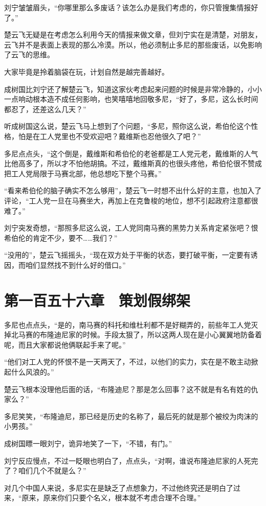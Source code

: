 刘宁皱皱眉头，“你哪里那么多废话？该怎么办是我们考虑的，你只管搜集情报好了。”

楚云飞无疑是在考虑怎么利用今天的情报来做文章，但刘宁实在是清楚，对朋友，云飞并不是表面上表现的那么冷漠。所以，他必须制止多尼的那些废话，以免影响了云飞的思维。

大家毕竟是拎着脑袋在玩，计划自然是越完善越好。

成树国比刘宁还了解楚云飞，知道这家伙考虑起来问题的时候是非常冷静的，小小一点响动根本造不成任何影响，也笑嘻嘻地回敬多尼，“好了，多尼，这么长时间都忍了，还差这么几天？”

听成树国这么说，楚云飞马上想到了个问题，“多尼，照你这么说，希伯伦这个性格，怕是在工人党里也不受欢迎吧？戴维斯也忍他很久了吧？”

多尼点点头，“这个倒是，戴维斯和希伯伦的老爸都是工人党元老，戴维斯的人气比他高多了，所以才不怕他胡搞。不过，戴维斯真的也很头疼他，希伯伦很不赞成把工人党局限于马赛北部，他总想吃下整个马赛。”

“看来希伯伦的脑子确实不怎么够用”，楚云飞一时想不出什么好的主意，也加入了评论，“工人党一旦在马赛坐大，再加上在克鲁梭的地位，想不引起政府注意都很难了。”

刘宁突发奇想，“那照多尼这么说，工人党同南马赛的黑势力关系肯定紧张吧？恨希伯伦的肯定不少，要不……我们？”

“没用的”，楚云飞摇摇头，“现在双方处于平衡的状态，要打破平衡，一定要有诱因，而咱们显然找不到什么好的借口。”

\section{第一百五十六章　策划假绑架}

多尼也点点头，“是的，南马赛的科托和维杜利都不是好糊弄的，前些年工人党灭掉北马赛的布隆迪尼家的时候。手段太狠了，所以这两人现在是小心翼翼地防备着呢，而且大家都说他俩联起手来了呢。”

“他们对工人党的怀恨不是一天两天了，不过，以他们的实力，实在是不敢主动掀起什么风浪的。”

楚云飞根本没理他后面的话，“布隆迪尼？那是怎么回事？这不就是有名有姓的仇家么？”

多尼笑笑，“布隆迪尼，那已经是历史的名称了，最后死的就是那个被绞为肉沫的小男孩。”

成树国瞟一眼刘宁，诡异地笑了一下，“不错，有门。”

刘宁反应慢点，不过一眨眼也明白了，点点头，“对啊，谁说布隆迪尼家的人死完了？咱们几个不就是么？”

对几个中国人来说，多尼实在是缺乏了点想象力，不过他终究还是明白了过来，“原来，原来你们只要个名义，根本就不考虑合理不合理。”

